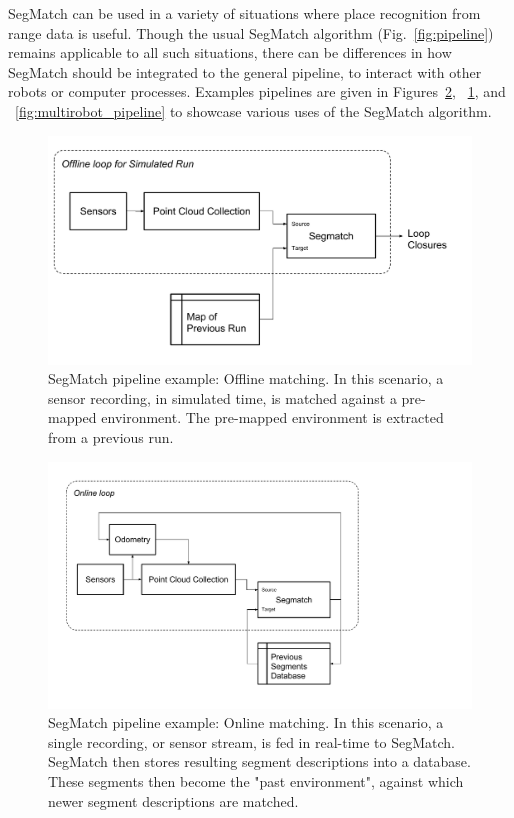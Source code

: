 SegMatch can be used in a variety of situations where place recognition from range data is useful. Though the usual SegMatch algorithm (Fig.~\ref{fig:pipeline}) remains applicable to all such situations, there can be differences in how SegMatch should be integrated to the general pipeline, to interact with other robots or computer processes. Examples pipelines are given in Figures~\ref{fig:online_pipeline}, ~\ref{fig:offline_pipeline}, and ~\ref{fig:multirobot_pipeline} to showcase various uses of the SegMatch algorithm.\\

\begin{figure}
  \centering
  \includegraphics[width=5.2in]{images/Offline_Pipeline.pdf}
  \caption{SegMatch pipeline example: Offline matching. In this scenario, a sensor recording, in simulated time, is matched against a pre-mapped environment. The pre-mapped environment is extracted from a previous run.}
  \label{fig:offline_pipeline}
\end{figure}

\begin{figure}
  \centering
  \includegraphics[width=5.2in]{images/Online_Pipeline.pdf}
  \caption{SegMatch pipeline example: Online matching. In this scenario, a single recording, or sensor stream, is fed in real-time to SegMatch. SegMatch then stores resulting segment descriptions into a database. These segments then become the "past environment", against which newer segment descriptions are matched.}
  \label{fig:online_pipeline}
\end{figure}

